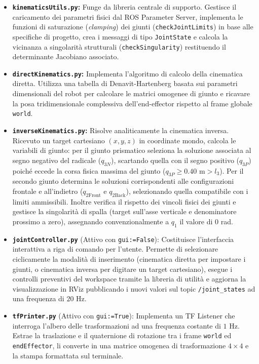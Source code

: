 \documentclass[11pt, a4paper]{report}
\begin{document}
\begin{itemize}
    \item \textbf{\texttt{kinematicsUtils.py}:} Funge da libreria centrale di supporto. Gestisce il caricamento dei parametri fisici dal ROS Parameter Server, implementa le funzioni di saturazione (\textit{clamping}) dei giunti (\texttt{checkJointLimits}) in base alle specifiche di progetto, crea i messaggi di tipo \texttt{JointState} e calcola la vicinanza a singolarità strutturali (\texttt{checkSingularity}) restituendo il determinante Jacobiano associato.

    \item \textbf{\texttt{directKinematics.py}:} Implementa l'algoritmo di calcolo della cinematica diretta. Utilizza una tabella di Denavit-Hartenberg basata sui parametri dimensionali del robot per calcolare le matrici omogenee di giunto e ricavare la posa tridimensionale complessiva dell'end-effector rispetto al frame globale \texttt{world}.

    \item \textbf{\texttt{inverseKinematics.py}:} Risolve analiticamente la cinematica inversa. Ricevuto un target cartesiano $(x, y, z)$ in coordinate mondo, calcola le variabili di giunto: per il giunto prismatico seleziona la soluzione associata al segno negativo del radicale ($q_{3N}$), scartando quella con il segno positivo ($q_{3P}$) poiché eccede la corsa fisica massima del giunto ($q_{3P} \ge 0.40\text{ m} > l_3$). Per il secondo giunto determina le soluzioni corrispondenti alle configurazioni frontale e all'indietro ($q_{2\text{Front}}$ e $q_{2\text{Back}}$), selezionando quella compatibile con i limiti ammissibili. Inoltre verifica il rispetto dei vincoli fisici dei giunti e gestisce la singolarità di spalla (target sull'asse verticale e denominatore prossimo a zero), assegnando convenzionalmente a $q_1$ il valore di $0$ rad.

    \item \texttt{\textbf{jointController.py}} (Attivo con \texttt{gui:=False}): Costituisce l'interfaccia interattiva a riga di comando per l'utente. Permette di selezionare ciclicamente la modalità di inserimento (cinematica diretta per impostare i giunti, o cinematica inversa per digitare un target cartesiano), esegue i controlli preventivi del workspace tramite la libreria di utilità e aggiorna la visualizzazione in RViz pubblicando i nuovi valori sul topic \texttt{/joint\_states} ad una frequenza di $20$ Hz.

    \item \texttt{\textbf{tfPrinter.py}} (Attivo con \texttt{gui:=True}): Implementa un TF Listener che interroga l'albero delle trasformazioni ad una frequenza costante di $1$ Hz. Estrae la traslazione e il quaternione di rotazione tra i frame \texttt{world} ed \texttt{endEffector}, li converte in una matrice omogenea di trasformazione $4 \times 4$ e la stampa formattata sul terminale.
\end{itemize}
\end{document}

